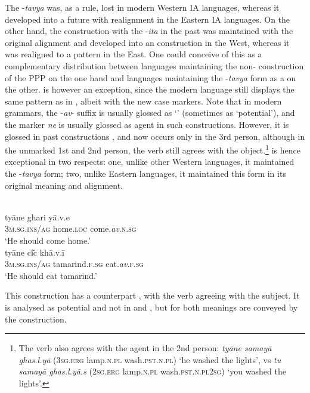 \documentclass[output=paper]{langsci/langscibook}
\begin{document}
The -\textit{tavya}   was, as a rule, lost in modern Western IA languages, whereas it developed into a future with  realignment in the Eastern IA languages. On the other hand, the construction with the   -\textit{ita} in the past was maintained with the original alignment and developed into an  construction in the West, whereas it was realigned to a  pattern in the East. One could conceive of this as a complementary distribution between languages maintaining the non- construction of the PPP on the one hand and languages maintaining the -\textit{tavya} form as a  on the other.  is however an exception, since the modern language still displays the same pattern as in , albeit with the new case markers. Note that in modern grammars, the -\textit{av}{}- suffix is usually glossed as ‘’ (sometimes as ‘potential’), and the marker \textit{ne} is usually glossed as agent in such constructions. However, it is glossed  in past constructions \citep[44]{DhongdeWali2009},  and now occurs only in the 3rd person, although in the unmarked 1st and 2nd person, the verb still agrees with the object.\footnote{The verb also agrees with the agent in the 2nd person: \textit{tyāne samayā ghas.l.yā} (\textsc{3sg.erg} lamp.\textsc{n.pl} wash.\textsc{pst.n.pl}) ‘he washed the lights’, vs \textit{tu samayā ghas.l.yā.s} (\textsc{2sg.erg} lamp.\textsc{n.pl} wash.\textsc{pst.n.pl2sg) ‘}you washed the lights’.}  is hence exceptional in two respects: one, unlike other Western languages, it maintained the -\textit{tavya}  form; two, unlike Eastern languages, it maintained this form in its original  meaning and alignment.

\ea\label{ex:montaut:31}
\\
\ea   
\gll tyāne           ghari       yā.v.e\\
\textsc{3m.sg.ins/ag}   home.\textsc{loc}    come.\textit{av}.\textsc{n.sg} \\
\glt ‘He should come home.’
\\
\ex  
\gll tyāne ci͂c                   khā.v.ī\\
\textsc{3m.sg.ins/ag}   tamarind.\textsc{f.sg}  eat.\textit{av}\textsc{.f.sg}  \\
\glt ‘He should eat tamarind.’
\z 
\z 

This construction has a  counterpart , with the verb agreeing with the subject. It is analysed as potential and not  in \citet{Wali2004} and \citet{DhongdeWali2009}, but for \citet[290]{Pandharipande1997} both meanings are conveyed by the  construction. 
\end{document}
